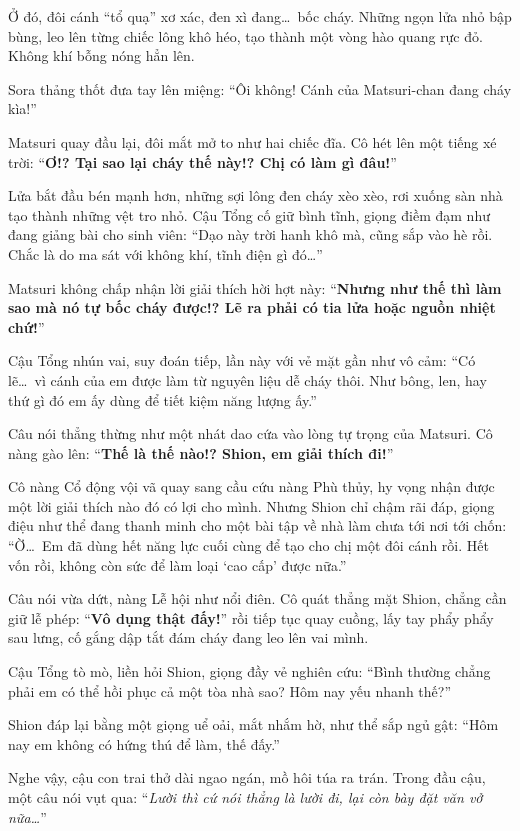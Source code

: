 \documentclass[../main.tex]{subfiles}
\begin{document}
Ở đó, đôi cánh ``tổ quạ'' xơ xác, đen xì đang\dots\ bốc cháy. Những ngọn lửa nhỏ bập bùng, leo lên từng chiếc lông khô héo, tạo thành một vòng hào quang rực đỏ. Không khí bỗng nóng hẳn lên.

Sora thảng thốt đưa tay lên miệng: ``Ôi không! Cánh của Matsuri-chan đang cháy kìa!''


Matsuri quay đầu lại, đôi mắt mở to như hai chiếc đĩa. Cô hét lên một tiếng xé trời: ``\textbf{Ơ!? Tại sao lại cháy thế này!? Chị có làm gì đâu!}''

Lửa bắt đầu bén mạnh hơn, những sợi lông đen cháy xèo xèo, rơi xuống sàn nhà tạo thành những vệt tro nhỏ. Cậu Tổng cố giữ bình tĩnh, giọng điềm đạm như đang giảng bài cho sinh viên: ``Dạo này trời hanh khô mà, cũng sắp vào hè rồi. Chắc là do ma sát với không khí, tĩnh điện gì đó\dots''

Matsuri không chấp nhận lời giải thích hời hợt này: ``\textbf{Nhưng như thế thì làm sao mà nó tự bốc cháy được!? Lẽ ra phải có tia lửa hoặc nguồn nhiệt chứ!}''

Cậu Tổng nhún vai, suy đoán tiếp, lần này với vẻ mặt gần như vô cảm: ``Có lẽ\dots\ vì cánh của em được làm từ nguyên liệu dễ cháy thôi. Như bông, len, hay thứ gì đó em ấy dùng để tiết kiệm năng lượng ấy.''

Câu nói thẳng thừng như một nhát dao cứa vào lòng tự trọng của Matsuri. Cô nàng gào lên: ``\textbf{Thế là thế nào!? Shion, em giải thích đi!}''

Cô nàng Cổ động vội vã quay sang cầu cứu nàng Phù thủy, hy vọng nhận được một lời giải thích nào đó có lợi cho mình. Nhưng Shion chỉ chậm rãi đáp, giọng điệu như thể đang thanh minh cho một bài tập về nhà làm chưa tới nơi tới chốn: ``Ờ\dots\ Em đã dùng hết năng lực cuối cùng để tạo cho chị một đôi cánh rồi. Hết vốn rồi, không còn sức để làm loại `cao cấp' được nữa.''

Câu nói vừa dứt, nàng Lễ hội như nổi điên. Cô quát thẳng mặt Shion, chẳng cần giữ lễ phép: ``\textbf{Vô dụng thật đấy!}'' rồi tiếp tục quay cuồng, lấy tay phẩy phẩy sau lưng, cố gắng dập tắt đám cháy đang leo lên vai mình.

Cậu Tổng tò mò, liền hỏi Shion, giọng đầy vẻ nghiên cứu: ``Bình thường chẳng phải em có thể hồi phục cả một tòa nhà sao? Hôm nay yếu nhanh thế?''

Shion đáp lại bằng một giọng uể oải, mắt nhắm hờ, như thể sắp ngủ gật: ``Hôm nay em không có hứng thú để làm, thế đấy.''

Nghe vậy, cậu con trai thở dài ngao ngán, mồ hôi túa ra trán. Trong đầu cậu, một câu nói vụt qua: ``\textit{Lười thì cứ nói thẳng là lười đi, lại còn bày đặt văn vở nữa…}''
\end{document}
